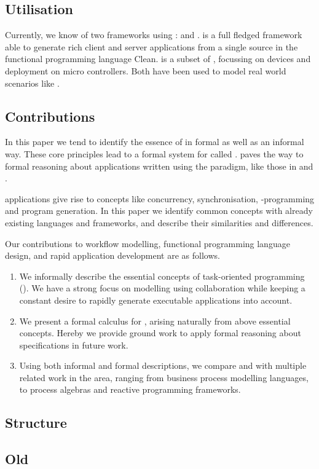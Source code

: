 \subsection{Utilisation}


Currently, we know of two frameworks using \TOP: \ITASKS and \MTASKS.
\ITASKS is a full fledged \TOP framework able to generate rich client and server applications from a single source in the functional programming language Clean.
\MTASKS is a subset of \ITASKS,
focussing on \IOT devices and deployment on micro controllers.
Both have been used to model real world scenarios like .



\subsection{Contributions}

In this paper we tend to identify the essence of \TOP in formal as well as an informal way.
These core principles lead to a formal system for \TOP called \TOPHAT.
\TOPHAT paves the way to formal reasoning about applications written using the \TOP paradigm,
like those in \ITASKS and \MTASKS.

\TOP applications give rise to concepts like concurrency, synchronisation, \GUI-programming and program generation.
In this paper we identify common concepts with already existing languages and frameworks,
and describe their similarities and differences.



Our contributions to workflow modelling, functional programming language design, and rapid application development are as follows.

\begin{enumerate}

  \item
    We informally describe the essential concepts of task-oriented programming (\TOP).
    We have a strong focus on modelling using collaboration
    while keeping a constant desire to rapidly generate executable applications into account.

  \item
    We present a formal calculus for \TOP, arising naturally from above essential concepts.
    Hereby we provide ground work to apply formal reasoning about \TOP specifications in future work.

  \item
    Using both informal and formal descriptions, we compare \TOP and \TOPHAT with multiple related work in the area,
    ranging from business process modelling languages, to process algebras and reactive programming frameworks.

\end{enumerate}



\subsection{Structure}





\subsection{Old}


